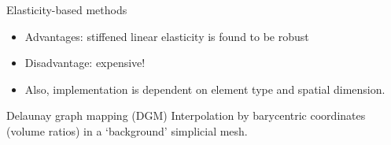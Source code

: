 \documentclass[t,12pt]{beamer}
\begin{document}
\begin{frame}{Elasticity-based methods}
\begin{itemize}
	\item Advantages: stiffened linear elasticity is found to be robust
	\item Disadvantage: expensive!
	\item Also, implementation is dependent on element type and spatial dimension.
\end{itemize}
\end{frame}

\begin{frame}{Delaunay graph mapping (DGM)}
Interpolation by barycentric coordinates (volume ratios) in a `background' simplicial mesh.
 \begin{figure}
 	\centering
\end{figure}
\end{frame}
\end{document}
